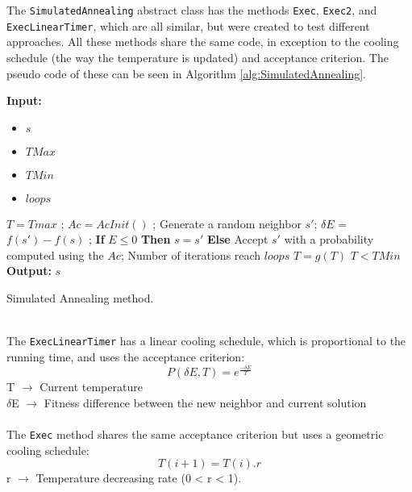 The \verb+SimulatedAnnealing+ abstract class has the methods \verb+Exec+, \verb+Exec2+, and \verb+ExecLinearTimer+, which are all similar, but were created to test different approaches. All these methods share the same code, in exception to the cooling schedule (the way the temperature is updated) and acceptance criterion. The pseudo code of these can be seen in Algorithm \ref{alg:SimulatedAnnealing}.\\
\begin{algorithm}[t!]
\textbf{Input:} 
\begin{itemize}
	\setlength{\itemsep}{1pt}
	\item $s$ 
	\item $TMax$ 
	\item $TMin$ 
	\item $loops$ 
\end{itemize}
\begin{algorithmic}
\State $T = Tmax$ ; 
\State $Ac = AcInit()$ ; 
\Repeat
	\Repeat	
		\State Generate a random neighbor $s'$;
		\State $\delta E$ = $f(s') - f(s)$ ;
		\State \textbf{If} $E \leq 0$ \textbf{Then} $s = s'$ 
		\State \textbf{Else} Accept $s'$ with a probability computed using the $Ac$;
	\Until Number of iterations reach $loops$
	\State $T = g(T )$ 
\Until $T < TMin$
\State \textbf{Output:} $s$ 
\end{algorithmic}
\caption{Simulated Annealing method.}
\label{alg:SimulatedAnnealing}
\end{algorithm}\\
The \verb+ExecLinearTimer+ has a linear cooling schedule, which is proportional to the running time, and uses the acceptance criterion:\\
\[P(\delta E, T) = e^{\frac{-\delta E}{T}} \]
T $\rightarrow$ Current temperature\\
$\delta$E $\rightarrow$ Fitness difference between the new neighbor and current solution\\
\\
The \verb+Exec+ method shares the same acceptance criterion but uses a geometric cooling schedule:\\
\[T (i+1) = T(i).r \]
r $\rightarrow$ Temperature decreasing rate (0 < r < 1).\\
